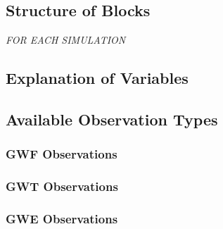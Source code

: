 

\subsection{Structure of Blocks}
\vspace{5mm}

\noindent \textit{FOR EACH SIMULATION}



\subsection{Explanation of Variables}
\begin{description}

\end{description}


\subsection{Available Observation Types}

\subsubsection{GWF Observations}


\subsubsection{GWT Observations}


\subsubsection{GWE Observations}

